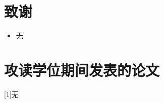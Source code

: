 
\chapter[致谢]{致\quad 谢}
\vbox{}

\begin{itemize}[itemsep=0pt,topsep=0pt]
	\item 无
\end{itemize}



\chapter{攻读学位期间发表的论文}
\vbox{}

\hspace{-0.85cm}[1]无

